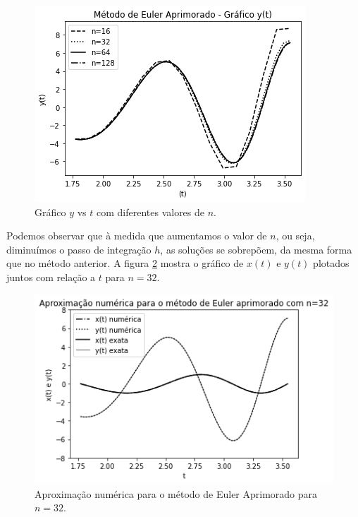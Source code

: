 \documentclass[amsmath,amssymb,floatfix]{revtex4}
\begin{document}
\begin{figure}[H]
\centering
\includegraphics[scale=0.56]{apriy_diferentesn}
\caption{Gráfico $y$ vs $t$ com diferentes valores de $n$.}
\label{apriy_difn}
\end{figure}

Podemos observar que à medida que aumentamos o valor de $n$, ou seja, diminuímos o passo de integração $h$, as soluções se sobrepõem, da mesma forma que no método anterior. A figura \ref{exatanumA} mostra o gráfico de $x(t)$ e $y(t)$ plotados juntos com relação a $t$ para $n=32$. 
\begin{figure}[H]
\centering
\includegraphics[scale=0.56]{exata_num_x_yA}
\caption{Aproximação numérica para o método de Euler Aprimorado para $n=32$.}
\label{exatanumA}
\end{figure}
\end{document}
